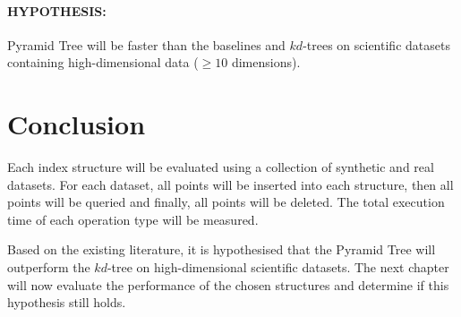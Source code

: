 \paragraph{\textbf{HYPOTHESIS:}} Pyramid Tree will be faster than the baselines and $kd$-trees on scientific datasets containing high-dimensional data ($\geq 10$ dimensions).

\section{Conclusion}

Each index structure will be evaluated using a collection of synthetic and real datasets. For each dataset, all points will be inserted into each structure, then all points will be queried and finally, all points will be deleted. The total execution time of each operation type will be measured.

Based on the existing literature, it is hypothesised that the Pyramid Tree will outperform the $kd$-tree on high-dimensional scientific datasets. The next chapter will now evaluate the performance of the chosen structures and determine if this hypothesis still holds.